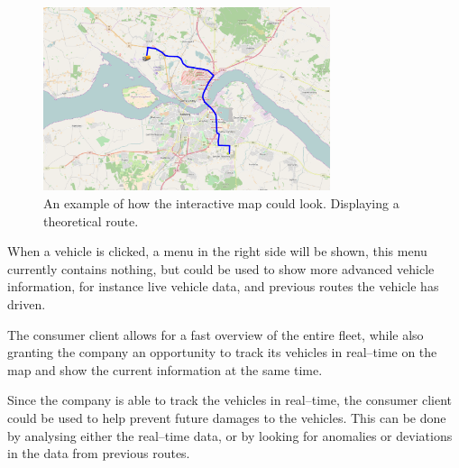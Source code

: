 \bigskip
\begin{figure}[h]
    \centering
    \includegraphics[width=0.75\textwidth]{img/ConsumerClientMap.png}
    \caption{An example of how the interactive map could look. Displaying a theoretical route.}
    \label{fig:ConsumerClientMap}
\end{figure}
When a vehicle is clicked, a menu in the right side will be shown, this menu currently contains nothing, but could be used to show more advanced vehicle information, for instance live vehicle data, and previous routes the vehicle has driven.

\bigskip
The consumer client allows for a fast overview of the entire fleet, while also granting the company an opportunity to track its vehicles in real--time on the map and show the current information at the same time.

Since the company is able to track the vehicles in real--time, the consumer client could be used to help prevent future damages to the vehicles.
This can be done by analysing either the real--time data, or by looking for anomalies or deviations in the data from previous routes.

